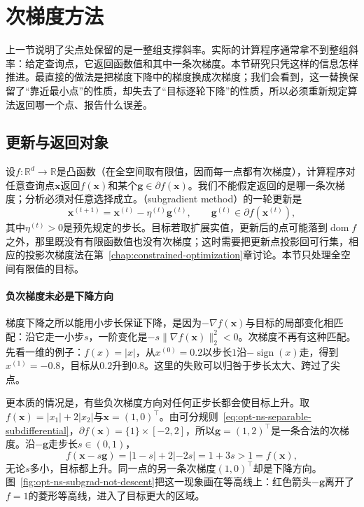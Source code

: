 \section{次梯度方法}
\label{sec:opt-ns-subgradient-methods}

上一节说明了尖点处保留的是一整组支撑斜率。实际的计算程序通常拿不到整组斜率：给定查询点，它返回函数值和其中一条次梯度。本节研究只凭这样的信息怎样推进。最直接的做法是把梯度下降中的梯度换成次梯度；我们会看到，这一替换保留了“靠近最小点”的性质，却失去了“目标逐轮下降”的性质，所以必须重新规定算法返回哪一个点、报告什么误差。

\subsection{更新与返回对象}
\label{sec:opt-ns-subgradient-update}

设$f:\mathbb R^d\to\mathbb R$是凸函数（在全空间取有限值，因而每一点都有次梯度），计算程序对任意查询点$\bm x$返回$f(\bm x)$和某个$\bm g\in\partial f(\bm x)$。我们不能假定返回的是哪一条次梯度；分析必须对任意选择成立。（subgradient method）的一轮更新是
\begin{equation}
 \bm x^{(t+1)}=\bm x^{(t)}-\eta^{(t)}\bm g^{(t)},\qquad\bm g^{(t)}\in\partial f(\bm x^{(t)}),
 \label{eq:opt-ns-subgradient-update}
\end{equation}
其中$\eta^{(t)}>0$是预先规定的步长。目标若取扩展实值，更新后的点可能落到$\operatorname{dom}f$之外，那里既没有有限函数值也没有次梯度；这时需要把更新点投影回可行集，相应的投影次梯度法在第~\ref{chap:constrained-optimization}章讨论。本节只处理全空间有限值的目标。

\paragraph{负次梯度未必是下降方向}
梯度下降之所以能用小步长保证下降，是因为$-\nabla f(\bm x)$与目标的局部变化相匹配：沿它走一小步$s$，一阶变化是$-s\lVert\nabla f(\bm x)\rVert_2^2<0$。次梯度不再有这种匹配。先看一维的例子：$f(x)=|x|$，从$x^{(0)}=0.2$以步长$1$沿$-\operatorname{sign}(x)$走，得到$x^{(1)}=-0.8$，目标从$0.2$升到$0.8$。这里的失败可以归咎于步长太大、跨过了尖点。

更本质的情况是，有些负次梯度方向对任何正步长都会使目标上升。取$f(\bm x)=|x_1|+2|x_2|$与$\bm x=(1,0)^\top$。由可分规则~\eqref{eq:opt-ns-separable-subdifferential}，$\partial f(\bm x)=\{1\}\times[-2,2]$，所以$\bm g=(1,2)^\top$是一条合法的次梯度。沿$-\bm g$走步长$s\in(0,1)$，
\[
 f(\bm x-s\bm g)=|1-s|+2|-2s|=1+3s>1=f(\bm x),
\]
无论$s$多小，目标都上升。同一点的另一条次梯度$(1,0)^\top$却是下降方向。图~\ref{fig:opt-ns-subgrad-not-descent}把这一现象画在等高线上：红色箭头$-\bm g$离开了$f=1$的菱形等高线，进入了目标更大的区域。

